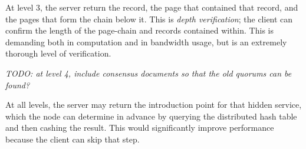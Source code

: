 At level 3, the server return the record, the page that contained that record, and the pages that form the chain below it. This is \textit{depth verification}; the client can confirm the length of the page-chain and records contained within. This is demanding both in computation and in bandwidth usage, but is an extremely thorough level of verification. 

\textit{TODO: at level 4, include consensus documents so that the old quorums can be found?}

At all levels, the server may return the introduction point for that hidden service, which the node can determine in advance by querying the distributed hash table and then cashing the result. This would significantly improve performance because the client can skip that step.



